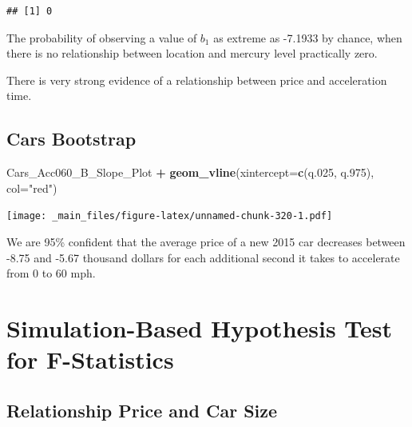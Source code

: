 \documentclass[]{book}
\newenvironment{Shaded}{\begin{snugshade}}{\end{snugshade}}
\newcommand{\KeywordTok}[1]{\textcolor[rgb]{0.13,0.29,0.53}{\textbf{#1}}}
\newcommand{\DataTypeTok}[1]{\textcolor[rgb]{0.13,0.29,0.53}{#1}}
\newcommand{\DecValTok}[1]{\textcolor[rgb]{0.00,0.00,0.81}{#1}}
\newcommand{\StringTok}[1]{\textcolor[rgb]{0.31,0.60,0.02}{#1}}
\newcommand{\OperatorTok}[1]{\textcolor[rgb]{0.81,0.36,0.00}{\textbf{#1}}}
\newcommand{\NormalTok}[1]{#1}
\begin{document}
\begin{verbatim}
## [1] 0
\end{verbatim}

The probability of observing a value of \(b_1\) as extreme as -7.1933 by
chance, when there is no relationship between location and mercury level
practically zero.

There is very strong evidence of a relationship between price and
acceleration time.

\subsection{Cars Bootstrap}\label{cars-bootstrap}

\begin{Shaded}
\end{Shaded}

\begin{Shaded}
\begin{Highlighting}[]
\NormalTok{Cars_Acc060_B_Slope_Plot }\OperatorTok{+}\StringTok{ }\KeywordTok{geom_vline}\NormalTok{(}\DataTypeTok{xintercept=}\KeywordTok{c}\NormalTok{(q.}\DecValTok{025}\NormalTok{, q.}\DecValTok{975}\NormalTok{), }\DataTypeTok{col=}\StringTok{"red"}\NormalTok{)}
\end{Highlighting}
\end{Shaded}

\texttt{[image: \_main\_files/figure-latex/unnamed-chunk-320-1.pdf]}

We are 95\% confident that the average price of a new 2015 car decreases
between -8.75 and -5.67 thousand dollars for each additional second it
takes to accelerate from 0 to 60 mph.

\section{Simulation-Based Hypothesis Test for
F-Statistics}\label{simulation-based-hypothesis-test-for-f-statistics}

\subsection{Relationship Price and Car
Size}\label{relationship-price-and-car-size}
\end{document}
